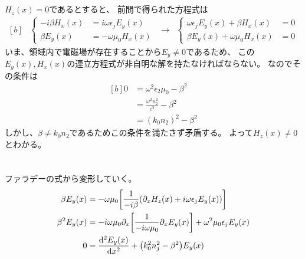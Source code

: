 \documentclass[../ap_2013.tex]{subfiles}
\begin{document}
\section{}
\(H_z(x)=0\)であるとすると、
前問で得られた方程式は
\begin{equation}\begin{aligned}[b]
    &\begin{cases}
        -i\beta H_x(x) &= i\omega\epsilon_jE_y(x)\\
        \beta E_y(x) &= -\omega\mu_0H_x(x)
    \end{cases} &\rightarrow
    &\begin{cases}
        \omega \epsilon_j E_y(x) + \beta H_x(x) &=0\\
        \beta E_y(x) + \omega \mu_0 H_x(x) &= 0
    \end{cases}
\end{aligned}\end{equation}
いま、領域内で電磁場が存在することから\(E_y\neq0\)であるため、
この\(E_y(x),H_x(x)\)の連立方程式が非自明な解を持たなければならない。
なのでその条件は
\begin{equation}\begin{aligned}[b]
    0&=\omega^2 \epsilon_2 \mu_0 -\beta^2 \\
    &= \frac{\omega^2 n_2^2}{c^2}-\beta^2\\
    &= (k_0n_2)^2-\beta^2
\end{aligned}\end{equation}
しかし、\(\beta\neq k_0n_2\)であるためこの条件を満たさず矛盾する。
よって\(H_z(x)\neq 0\)とわかる。

\section{}
ファラデーの式から変形していく。
\begin{equation}\begin{aligned}[b]
    \beta E_y(x) &= -\omega\mu_0\qty[\frac{1}{-i\beta}\qty(\partial_xH_z(x)+i\omega\epsilon_jE_y(x))]\\
    \beta^2 E_y(x) &= -i\omega\mu_0\partial_x\qty[\frac{1}{-i\omega\mu_0}\partial_xE_y(x)]
    +\omega^2\mu_0\epsilon_j E_y(x)\\
    0 &= \dv[2]{E_y(x)}{x}+\qty(k_0^2n_j^2-\beta^2)E_y(x)
\end{aligned}\end{equation}
\end{document}
